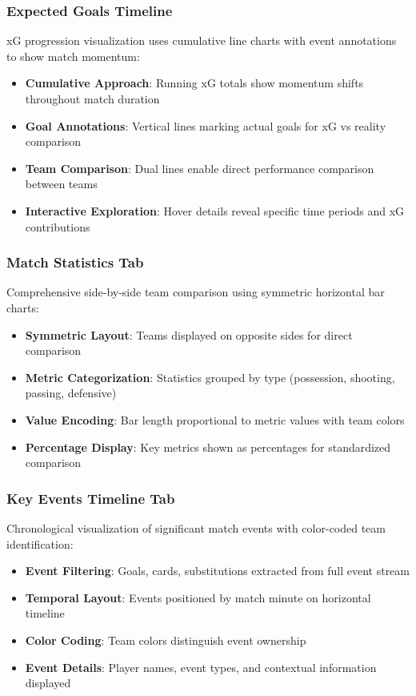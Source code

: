 \documentclass[12pt,a4paper]{article}
\begin{document}
\subsubsection{Expected Goals Timeline}
xG progression visualization uses cumulative line charts with event annotations to show match momentum:
\begin{itemize}
    \item \textbf{Cumulative Approach}: Running xG totals show momentum shifts throughout match duration
    \item \textbf{Goal Annotations}: Vertical lines marking actual goals for xG vs reality comparison
    \item \textbf{Team Comparison}: Dual lines enable direct performance comparison between teams
    \item \textbf{Interactive Exploration}: Hover details reveal specific time periods and xG contributions
\end{itemize}



\subsubsection{Match Statistics Tab}
\label{sec:match_statistics}
Comprehensive side-by-side team comparison using symmetric horizontal bar charts:
\begin{itemize}
    \item \textbf{Symmetric Layout}: Teams displayed on opposite sides for direct comparison
    \item \textbf{Metric Categorization}: Statistics grouped by type (possession, shooting, passing, defensive)
    \item \textbf{Value Encoding}: Bar length proportional to metric values with team colors
    \item \textbf{Percentage Display}: Key metrics shown as percentages for standardized comparison
\end{itemize}

\subsubsection{Key Events Timeline Tab}
Chronological visualization of significant match events with color-coded team identification:
\begin{itemize}
    \item \textbf{Event Filtering}: Goals, cards, substitutions extracted from full event stream
    \item \textbf{Temporal Layout}: Events positioned by match minute on horizontal timeline
    \item \textbf{Color Coding}: Team colors distinguish event ownership
    \item \textbf{Event Details}: Player names, event types, and contextual information displayed
\end{itemize}
\end{document}
